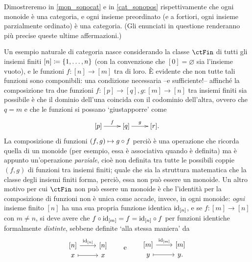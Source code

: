 Dimostreremo in \ref{mon_sonocat} e in \ref{cat_sonopos} rispettivamente che ogni monoide è una categoria, e ogni insieme preordinato (e a fortiori, ogni insieme parzialmente ordinato) è una categoria. (Gli enunciati in questione renderanno più precise queste ultime affermazioni.)
\begin{example}
	Un esempio naturale di categoria nasce considerando la classe \(\ctFin\) di tutti gli insiemi finiti \([n]\coloneqq \{1,\dots,n\}\) (con la convenzione che \([0]=\varnothing\) sia l'insieme vuoto), e le funzioni \(f : [n] \to [m]\) tra di loro. \`E evidente che non tutte tali funzioni sono componibili: una condizione necessaria --e sufficiente!-- affinché la composizione tra due funzioni \(f : [p] \to [q],g : [m] \to [n]\) tra insiemi finiti sia possibile è che il dominio dell'una coincida con il codominio dell'altra, ovvero che \(q=m\) e che le funzioni si possano `giustapporre' come
	\[\xymatrix{
			[p] \ar[r]^-f & [q] \ar[r]^-g & [r].
		}\]
	La composizione di funzioni \((f,g)\mapsto g\circ f\) perciò è una operazione che ricorda quella di un monoide (per esempio, essa è associativa quando è definita) ma è appunto un'operazione \emph{parziale}, cioè non definita tra tutte le possibili coppie \((f,g)\) di funzioni tra insiemi finiti; quale che sia la struttura matematica che la classe degli insiemi finiti forma, perciò, essa non può essere un monoide. Un altro motivo per cui \(\ctFin\) non può essere un monoide è che l'identità per la composizione di funzioni non è unica come accade, invece, in ogni monoide: \emph{ogni} insieme finito \([n]\) ha una sua propria funzione identica \(\mathrm{id}_{[n]}\), e se \(f : [m]\to [n]\) con \(m\ne n\), si deve avere che \(f\circ \mathrm{id}_{[m]}=f=\mathrm{id}_{[n]}\circ f\) per funzioni identiche formalmente \emph{distinte}, sebbene definite `alla stessa maniera' da
	\[
	\begin{tikzcd}[row sep=0]
		{[n]} \ar{r}{\id_{[n]}} & {[n]} \\
		x \ar[mapsto]{r} & x
	\end{tikzcd}
	\qquad\mbox{e}\qquad
	\begin{tikzcd}[row sep=0]
		{[m]} \ar{r}{\id_{[m]}} & {[m]} \\
		y \ar[mapsto]{r} & y .
	\end{tikzcd}
	\]


\end{example}
